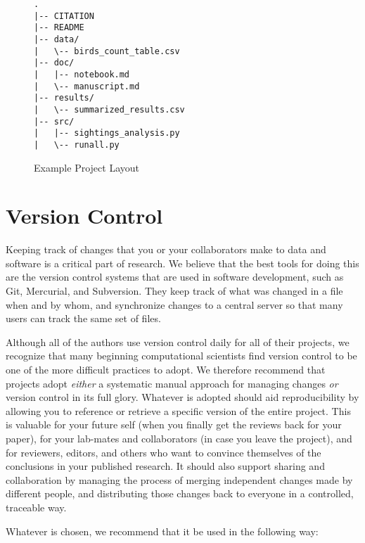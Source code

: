 \documentclass[10pt]{article}
\begin{document}
\begin{figure}
\begin{verbatim}
.
|-- CITATION
|-- README
|-- data/
|   \-- birds_count_table.csv
|-- doc/
|   |-- notebook.md
|   \-- manuscript.md
|-- results/
|   \-- summarized_results.csv
|-- src/
|   |-- sightings_analysis.py
|   \-- runall.py
\end{verbatim}
\caption{Example Project Layout}
\label{fig:layout}
\end{figure}

\section{Version Control}\label{sec:versioning}

Keeping track of changes that you or your collaborators make to data
and software is a critical part of research.  We believe that the best
tools for doing this are the version control systems that are used in
software development, such as Git, Mercurial, and Subversion.  They
keep track of what was changed in a file when and by whom, and
synchronize changes to a central server so that many users can track
the same set of files.

Although all of the authors use version control daily for all of their
projects, we recognize that many beginning computational scientists
find version control to be one of the more difficult practices to
adopt.  We therefore recommend that projects adopt \emph{either} a
systematic manual approach for managing changes \emph{or} version
control in its full glory.  Whatever is adopted should aid
reproducibility by allowing you to reference or retrieve a specific
version of the entire project. This is valuable for your future self
(when you finally get the reviews back for your paper), for your
lab-mates and collaborators (in case you leave the project), and for
reviewers, editors, and others who want to convince themselves of the
conclusions in your published research.  It should also support
sharing and collaboration by managing the process of merging
independent changes made by different people, and distributing those
changes back to everyone in a controlled, traceable way.

Whatever is chosen, we recommend that it be used in the following way:
\end{document}
